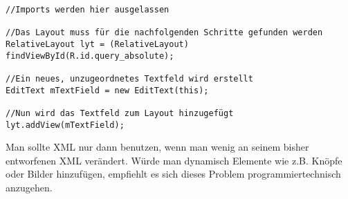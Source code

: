 \begin{lstlisting}
//Imports werden hier ausgelassen

//Das Layout muss für die nachfolgenden Schritte gefunden werden
RelativeLayout lyt = (RelativeLayout) findViewById(R.id.query_absolute);

//Ein neues, unzugeordnetes Textfeld wird erstellt
EditText mTextField = new EditText(this);

//Nun wird das Textfeld zum Layout hinzugefügt
lyt.addView(mTextField);
\end{lstlisting}

Man sollte XML nur dann benutzen, wenn man wenig an seinem bisher entworfenen XML verändert. Würde man dynamisch Elemente wie z.B. Knöpfe oder Bilder hinzufügen, empfiehlt es sich dieses Problem programmiertechnisch anzugehen.